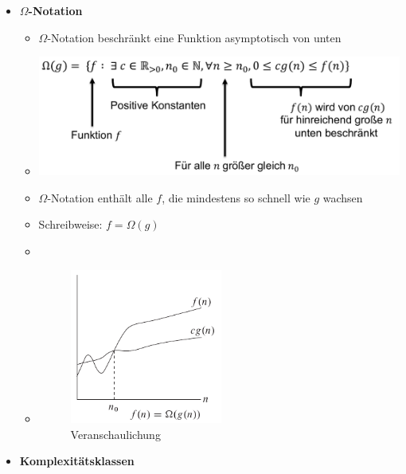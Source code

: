 \documentclass[
    ngerman,
    color=3b,
    load_common, %
    summary,
    boxarc,
]{tuda_summary}
\begin{document}
\begin{itemize}
    \item \textbf{$\Omega$-Notation}
          \begin{itemize}
              \item $\Omega$-Notation beschränkt eine Funktion asymptotisch von unten
              \item[] \includegraphics[width=12cm]{pictures/omegaNotation.pdf}
              \item $\Omega$-Notation enthält alle $f$, die mindestens so schnell wie $g$ wachsen
              \item Schreibweise: $f = \Omega(g)$
              \item[]
              \item[]
                    \begin{minipage}{0.3\textwidth}
                        \begin{figure}[H]
                            \centering
                            \includegraphics[width=5cm]{pictures/omegaNotationGraph.pdf}
                            \caption{Veranschaulichung}
                            \label{}
                        \end{figure}
                    \end{minipage}
                    \begin{minipage}[t]{0.6\textwidth}
                        \vspace{-3cm}
                    \end{minipage}
          \end{itemize}
          \clearpage
    \item \textbf{Komplexitätsklassen}

\end{itemize}
\end{document}
